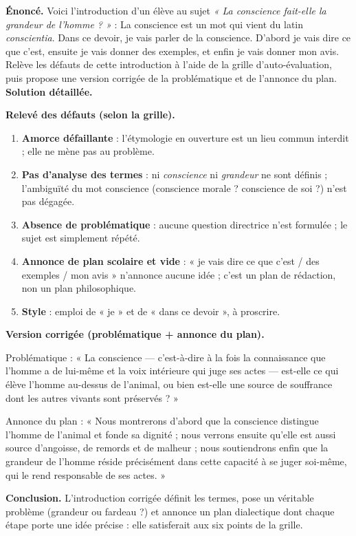 \documentclass[11pt]{article}
\begin{document}
\begin{exoresolu}
\textbf{Énoncé.} Voici l'introduction d'un élève au sujet \emph{« La conscience fait-elle la grandeur de l'homme ? »} : \og La conscience est un mot qui vient du latin \emph{conscientia}. Dans ce devoir, je vais parler de la conscience. D'abord je vais dire ce que c'est, ensuite je vais donner des exemples, et enfin je vais donner mon avis. \fg{} Relève les défauts de cette introduction à l'aide de la grille d'auto-évaluation, puis propose une version corrigée de la problématique et de l'annonce du plan.
\tcblower
\textbf{Solution détaillée.}

\textbf{Relevé des défauts (selon la grille).}
\begin{enumerate}
\item \textbf{Amorce défaillante} : l'étymologie en ouverture est un lieu commun interdit ; elle ne mène pas au problème.
\item \textbf{Pas d'analyse des termes} : ni \emph{conscience} ni \emph{grandeur} ne sont définis ; l'ambiguïté du mot conscience (conscience morale ? conscience de soi ?) n'est pas dégagée.
\item \textbf{Absence de problématique} : aucune question directrice n'est formulée ; le sujet est simplement répété.
\item \textbf{Annonce de plan scolaire et vide} : « je vais dire ce que c'est / des exemples / mon avis » n'annonce aucune idée ; c'est un plan de rédaction, non un plan philosophique.
\item \textbf{Style} : emploi de « je » et de « dans ce devoir », à proscrire.
\end{enumerate}

\textbf{Version corrigée (problématique + annonce du plan).}

Problématique : « La conscience — c'est-à-dire à la fois la connaissance que l'homme a de lui-même et la voix intérieure qui juge ses actes — est-elle ce qui élève l'homme au-dessus de l'animal, ou bien est-elle une source de souffrance dont les autres vivants sont préservés ? »

Annonce du plan : « Nous montrerons d'abord que la conscience distingue l'homme de l'animal et fonde sa dignité ; nous verrons ensuite qu'elle est aussi source d'angoisse, de remords et de malheur ; nous soutiendrons enfin que la grandeur de l'homme réside précisément dans cette capacité à se juger soi-même, qui le rend responsable de ses actes. »

\textbf{Conclusion.} L'introduction corrigée définit les termes, pose un véritable problème (grandeur ou fardeau ?) et annonce un plan dialectique dont chaque étape porte une idée précise : elle satisferait aux six points de la grille.
\end{exoresolu}
\end{document}
